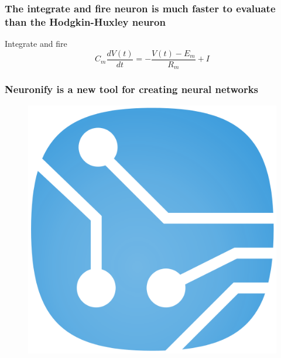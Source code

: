 \documentclass{beamer}
\begin{document}
\begin{frame}
\frametitle{The integrate and fire neuron is much faster to evaluate than the Hodgkin-Huxley neuron}
\begin{block}{Integrate and fire}
\pause
\begin{equation*}
C_m \frac{dV(t)}{dt} = - \frac{V(t) - E_m}{R_m} + I
\end{equation*}
\end{block}

\end{frame}





\begin{frame}
\frametitle{Neuronify is a new tool for creating neural networks}
\begin{figure}
\includegraphics[height = 0.8\textheight]{logo.png}
\end{figure}
\end{frame}
\end{document}
